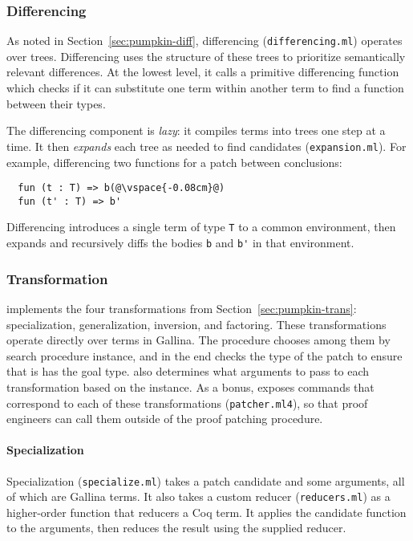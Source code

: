\subsubsection{Differencing} 
\label{sec:pumpkin-impl-diff}

As noted in Section~\ref{sec:pumpkin-diff}, differencing (\lstinline{differencing.ml}) operates over trees.
Differencing uses the structure of these trees to prioritize semantically relevant differences.
At the lowest level, it calls a primitive differencing function which checks if it can substitute one term within another term to find a function between their types.

The differencing component is \textit{lazy}: it compiles terms into trees one step at a time.
It then \emph{expands} each tree as needed to find candidates (\lstinline{expansion.ml}).
For example, differencing two functions for a patch between conclusions:

\begin{lstlisting}
  fun (t : T) => b(@\vspace{-0.08cm}@)
  fun (t' : T) => b'
\end{lstlisting}
Differencing introduces a single term of type \lstinline{T} to a common environment,
then expands and recursively diffs the bodies \lstinline{b} and \lstinline{b'} in that environment.

\subsubsection{Transformation}
\label{sec:pumpkin-impl-trans}

\sysname implements the four transformations from Section~\ref{sec:pumpkin-trans}:
specialization, generalization, inversion, and factoring.
These transformations operate directly over terms in Gallina.
The \sysname procedure chooses among them by search procedure instance,
and in the end checks the type of the patch to ensure that is has the goal type.
\sysname also determines what arguments to pass to each transformation based on the instance.
As a bonus, \sysname exposes commands that correspond to each of these transformations (\lstinline{patcher.ml4}),
so that proof engineers can call them outside of the proof patching procedure.

\paragraph{Specialization} Specialization (\lstinline{specialize.ml}) takes a patch candidate and some arguments,
all of which are Gallina terms.
It also takes a custom reducer (\lstinline{reducers.ml}) %
as a higher-order function that reducers a Coq term.
It applies the candidate function to the arguments, then reduces the result using the supplied reducer.

